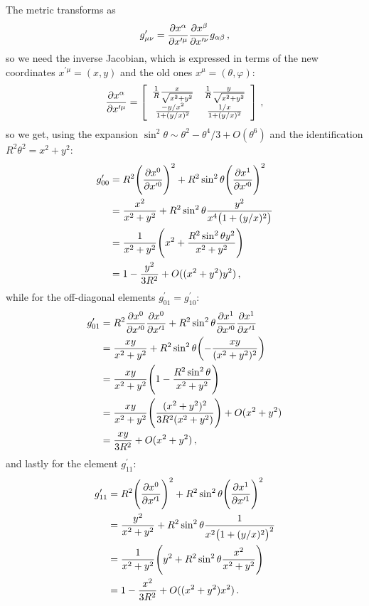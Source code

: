 \documentclass[main.tex]{subfiles}
\begin{document}
The metric transforms as 
%
\begin{align}
  g_{\mu \nu }^{\prime } 
  = \pdv{x^{\alpha }}{x^{\prime \mu }}
  \pdv{x^{\beta }}{x^{\prime  \nu }}
  g_{\alpha \beta }
\,,
\end{align}
%
so we need the inverse Jacobian, which is expressed in terms of the new coordinates \(x^{\prime \mu } = (x, y)\) and the old ones \(x^{\mu } = (\theta , \varphi )\):
%
\begin{align}
  \pdv{x^{\alpha }}{x^{\prime \mu }}
  = \left[\begin{array}{cc}
  \frac{1}{R} \frac{x}{\sqrt{x^2 + y^2}} & 
  \frac{1}{R} \frac{y}{\sqrt{x^2 + y^2}} \\ 
  \frac{-y / x^2}{1 + (y/x)^2} & 
  \frac{1/x}{1 + (y/x)^2}
  \end{array}\right]
\,,
\end{align}
%
so we get, using the expansion \(\sin^2\theta \sim \theta^2 - \theta^{4} /3 + O (\theta^{6})\) and the identification \(R^2\theta^2 = x^2+y^2\):
%
\begin{subequations}
\begin{align}
  g_{00}^{\prime } &= R^2 \qty(\pdv{x^{0}}{x^{\prime 0}})^2
  + R^2 \sin^2 \theta \qty(\pdv{x^{1}}{x^{\prime 0}})^2  \\
  &= \frac{x^2}{x^2+y^2} + R^2 \sin^2 \theta \frac{y^2}{x^{4} \qty(1 + (y/x)^2)}  \\
  &=\frac{1}{x^2+y^2} \qty(x^2 + \frac{R^2 \sin^2\theta y^2}{x^2+y^2})  \\
  &= 1 - \frac{y^2}{3R^2} + O((x^2+y^2)y^2)
\,,
\end{align}
\end{subequations}
%
while for the off-diagonal elements \(g_{01}^{\prime } = g_{10}^{\prime }\): 
%
\begin{subequations}
\begin{align}
  g_{01}^{\prime } &= R^2 \pdv{x^{0}}{x^{\prime 0}} \pdv{x^{0}}{x^{\prime 1}} 
  + R^2 \sin^2 \theta \pdv{x^{1}}{x^{\prime 0}} \pdv{x^{1}}{x^{\prime 1}}  \\
  &= \frac{xy}{x^2+y^2} + R^2 \sin^2\theta \qty(- \frac{xy}{(x^2+y^2)^2})  \\
  &= \frac{xy}{x^2+y^2} \qty(1 - \frac{R^2 \sin^2\theta }{x^2+y^2})  \\
  &= \frac{xy}{x^2+y^2} \qty(\frac{(x^2+y^2)^2}{3R^2 (x^2+y^2)}) + O(x^2+y^2) \\
  &= \frac{xy}{3R^2} + O(x^2+y^2)
\,,
\end{align}
\end{subequations}
%
and lastly for the element \(g_{11}^{\prime }\): 
%
\begin{subequations}
\begin{align}
  g_{11}^{\prime } &=  R^2 \qty(\pdv{x^{0}}{x^{\prime 1}})^2
  + R^2 \sin^2 \theta \qty(\pdv{x^{1}}{x^{\prime 1}})^2  \\
  &= \frac{y^2}{x^2+y^2} + R^2 \sin^2 \theta \frac{1}{x^{2} \qty(1 + (y/x)^2)^2}  \\
  &= \frac{1}{x^2+y^2} \qty(y^2 +  R^2 \sin^2\theta \frac{x^2}{x^2+y^2})  \\
  &= 1 - \frac{x^2}{3R^2} + O ((x^2+y^2) x^2)
  \,.
\end{align}
\end{subequations}
\end{document}
